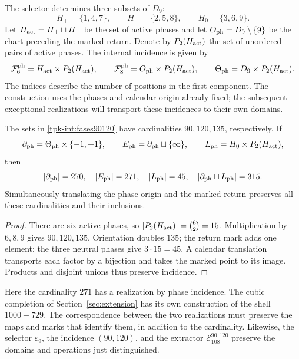 The selector determines three subsets of \(D_9\):
\[
 H_+=\{1,4,7\},\qquad H_-=\{2,5,8\},\qquad H_0=\{3,6,9\}.
\]
Let \(H_{\rm act}=H_+\sqcup H_-\) be the set of active phases and
let \(O_{\rm ph}=D_9\setminus\{9\}\) be the chart preceding the marked
return. Denote by \(P_2(H_{\rm act})\) the set of unordered pairs
of active phases. The internal incidence is given by
\begin{equation}
 \mathcal F^{\rm ph}_6=H_{\rm act}\times P_2(H_{\rm act}),\qquad
 \mathcal F^{\rm ph}_8=O_{\rm ph}\times P_2(H_{\rm act}),\qquad
 \Theta_{\rm ph}=D_9\times P_2(H_{\rm act}).
 \label{tpk-int:fases90120}
\end{equation}
The indices describe the number of positions in the first component.
The construction uses the phases and calendar origin already fixed;
the subsequent exceptional realizations will transport these
incidences to their own domains.

\begin{proposition}
\label{tpk-int:cardinales}
The sets in \eqref{tpk-int:fases90120} have cardinalities
\(90,120,135\), respectively. If
\[
 \partial_{\rm ph}=\Theta_{\rm ph}\times\{-1,+1\},\qquad
 E_{\rm ph}=\partial_{\rm ph}\sqcup\{\infty\},\qquad
 L_{\rm ph}=H_0\times P_2(H_{\rm act}),
\]
then
\[
 |\partial_{\rm ph}|=270,\quad |E_{\rm ph}|=271,\quad
 |L_{\rm ph}|=45,\quad
 |\partial_{\rm ph}\sqcup L_{\rm ph}|=315.
\]
Simultaneously translating the phase origin and the marked return preserves
all these cardinalities and their inclusions.
\end{proposition}
\begin{proof}
There are six active phases, so
\(|P_2(H_{\rm act})|=\binom62=15\). Multiplication by
\(6,8,9\) gives \(90,120,135\). Orientation doubles \(135\);
the return mark adds one element; the three neutral phases give
\(3\cdot15=45\). A calendar translation transports each
factor by a bijection and takes the marked point to its image. Products
and disjoint unions thus preserve incidence.
\end{proof}

Here the cardinality \(271\) has a realization by phase incidence.
The cubic completion of Section~\ref{sec:extension} has
its own construction of the shell \(1000-729\). The correspondence
between the two realizations must preserve the maps and marks that
identify them, in addition to the cardinality. Likewise, the selector
\(\varepsilon_9\), the incidence \((90,120)\), and the extractor
\(\mathcal E_{108}^{90,120}\) preserve the domains and operations
just distinguished.

